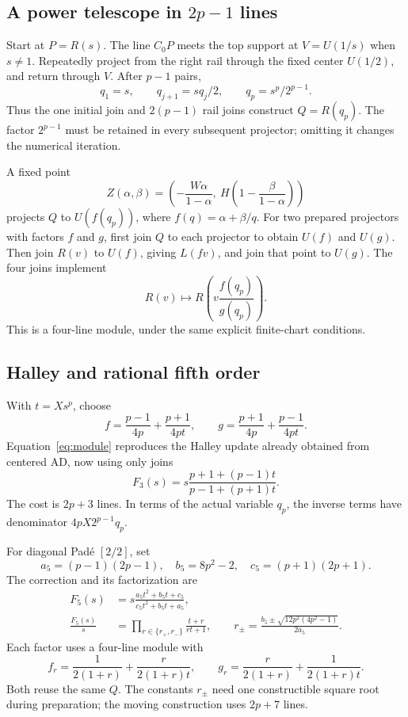 \documentclass[11pt,a4paper]{article}
\theoremstyle{remark}\newtheorem{remark}[theorem]{Remark}
\begin{document}
\subsection{A power telescope in \texorpdfstring{$2p-1$}{2p-1} lines}
Start at $P=R(s)$. The line $C_0P$ meets the top support at $V=U(1/s)$ when $s\ne1$. Repeatedly project from the right rail through the fixed center $U(1/2)$, and return through $V$. After $p-1$ pairs,
\begin{equation}\label{eq:telescope}
 q_1=s,\qquad q_{j+1}=sq_j/2,\qquad q_p=s^p/2^{p-1}.
\end{equation}
Thus the one initial join and $2(p-1)$ rail joins construct $Q=R(q_p)$. The factor $2^{p-1}$ must be retained in every subsequent projector; omitting it changes the numerical iteration.

A fixed point
\[
 Z(\alpha,\beta)=\left(-\frac{W\alpha}{1-\alpha},\ H\left(1-\frac{\beta}{1-\alpha}\right)\right)
\]
projects $Q$ to $U(f(q_p))$, where $f(q)=\alpha+\beta/q$. For two prepared projectors with factors $f$ and $g$, first join $Q$ to each projector to obtain $U(f)$ and $U(g)$. Then join $R(v)$ to $U(f)$, giving $L(fv)$, and join that point to $U(g)$. The four joins implement
\begin{equation}\label{eq:module}
 R(v)\longmapsto R\!\left(v\frac{f(q_p)}{g(q_p)}\right).
\end{equation}
This is a four-line module, under the same explicit finite-chart conditions.

\subsection{Halley and rational fifth order}
With $t=Xs^p$, choose
\[
 f=\frac{p-1}{4p}+\frac{p+1}{4pt},\qquad
 g=\frac{p+1}{4p}+\frac{p-1}{4pt}.
\]
Equation~\eqref{eq:module} reproduces the Halley update already obtained from centered AD, now using only joins
\begin{equation}\label{eq:halley}
 F_3(s)=s\frac{p+1+(p-1)t}{p-1+(p+1)t}.
\end{equation}
The cost is $2p+3$ lines. In terms of the actual variable $q_p$, the inverse terms have denominator $4pX2^{p-1}q_p$.

For diagonal Pad\'e $[2/2]$, set
\[
 a_5=(p-1)(2p-1),\quad b_5=8p^2-2,\quad c_5=(p+1)(2p+1).
\]
The correction and its factorization are
\begin{align}
 F_5(s)&=s\frac{a_5 t^2+b_5 t+c_5}{c_5 t^2+b_5 t+a_5},\label{eq:rational5}\\
 \frac{F_5(s)}s&=\prod_{r\in\{r_+,r_-\}}\frac{t+r}{rt+1},\qquad
 r_\pm=\frac{b_5\pm\sqrt{12p^2(4p^2-1)}}{2a_5}.
\end{align}
Each factor uses a four-line module with
\[
 f_r=\frac{1}{2(1+r)}+\frac{r}{2(1+r)t},\qquad
 g_r=\frac{r}{2(1+r)}+\frac{1}{2(1+r)t}.
\]
Both reuse the same $Q$. The constants $r_\pm$ need one constructible square root during preparation; the moving construction uses $2p+7$ lines.
\end{document}
